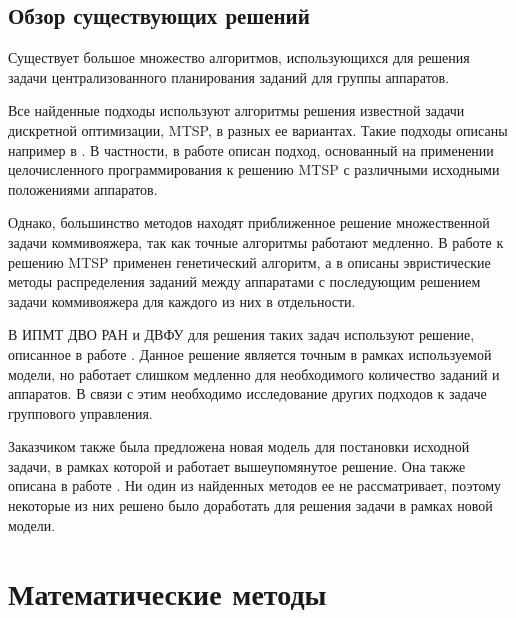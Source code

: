 \documentclass[a4paper,14pt,russian]{article}
\begin{document}
\subsection{Обзор существующих решений}


Существует большое множество алгоритмов, использующихся для решения задачи централизованного планирования заданий для группы аппаратов.

Все найденные подходы используют алгоритмы решения известной задачи дискретной оптимизации, MTSP, в разных ее вариантах. Такие подходы описаны например в \cite{bektas2006multiple}. В частности, в работе \cite{binaryprog} описан подход, основанный на применении целочисленного программирования к решению MTSP с различными исходными положениями аппаратов.

Однако, большинство методов находят приближенное решение множественной задачи коммивояжера, так как точные алгоритмы работают медленно. В работе \cite{kiraly2010novel} к решению MTSP применен генетический алгоритм, а в \cite{na2007heurisic} описаны эвристические методы распределения заданий между аппаратами с последующим решением задачи коммивояжера для каждого из них в отдельности.


В ИПМТ ДВО РАН и ДВФУ для решения таких задач используют решение, описанное в работе \cite{tuphanov1}. Данное решение является точным в рамках используемой модели, но работает слишком медленно для необходимого количество заданий и аппаратов. В связи с этим необходимо исследование других подходов к задаче группового управления.

Заказчиком также была предложена новая модель для постановки исходной задачи, в рамках которой и работает вышеупомянутое решение. Она также описана в работе \cite{tuphanov1}. Ни один из найденных методов ее не рассматривает, поэтому некоторые из них решено было доработать для решения задачи в рамках новой модели.

\section{Математические методы}
\end{document}
